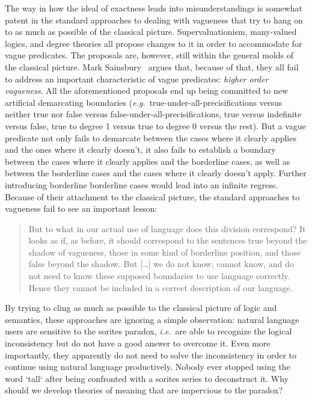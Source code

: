 \documentclass[a4paper]{article}
\begin{document}
The way in how the ideal of exactness leads into misunderstandings is somewhat patent in the standard approaches to dealing with vagueness that try to hang on to as much as possible of the classical picture.
Supervaluationism, many-valued logics, and degree theories all propose changes to it in order to accommodate for vague predicates.
The proposals are, however, still within the general molds of the classical picture.
Mark Sainsbury~\parencite*{sainsbury_concepts_1999} argues that, because of that, they all fail to address an important characteristic of vague predicates: \emph{higher order vagueness}.
All the aforementioned proposals end up being committed to new artificial demarcating boundaries (\emph{e.g.}~true-under-all-precisifications versus neither true nor false versus false-under-all-precisifications, true versus indefinite versus false, true to degree 1 versus true to degree 0 versus the rest).
But a vague predicate not only fails to demarcate between the cases where it clearly applies and the ones where it clearly doesn't, it also fails to establish a boundary between the cases where it clearly applies and the borderline cases, as well as between the borderline cases and the cases where it clearly doesn't apply.
Further introducing borderline borderline cases would lead into an infinite regress.
Because of their attachment to the classical picture, the standard approaches to vagueness fail to see an important lesson:
\begin{quote}
But to what in our actual use of language does this division correspond?
It looks as if, as before, it should correspond to the sentences true beyond the shadow of vagueness, those in some kind of borderline position, and those false beyond the shadow.
But [\ldots] we do not know, cannot know, and do not need to know these supposed boundaries to use language correctly.
Hence they cannot be included in a correct description of our language.%
~\parencite[256]{sainsbury_concepts_1999}
\end{quote}
By trying to cling as much as possible to the classical picture of logic and semantics, these approaches are ignoring a simple observation: natural language users are sensitive to the sorites paradox, \emph{i.e.}~are able to recognize the logical inconsistency but do not have a good answer to overcome it.
Even more importantly, they apparently do not need to solve the inconsistency in order to continue using natural language productively.
Nobody ever stopped using the word `tall` after being confronted with a sorites series to deconstruct it.
Why should we develop theories of meaning that are impervious to the paradox?
\end{document}
